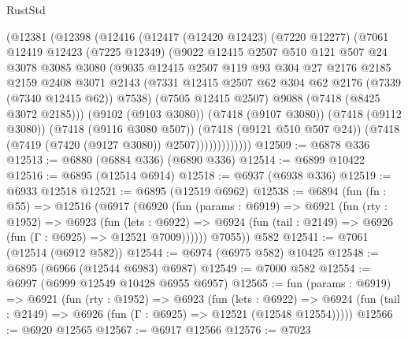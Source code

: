 \begin{lexlean}{RustStd}
\begin{coremodule}
              (@12381
                (@12398
                  (@12416
                    (@12417
                      (@12420 @12423)
                      (@7220 @12277)
                      (@7061
                        @12419
                        @12423
                        (@7225 @12349)
                        (@9022
                          @12415
                          @2507
                          @510
                          @121
                          @507
                          @24
                          @3078
                          @3085
                          @3080
                          (@9035
                            @12415
                            @2507
                            @119
                            @93
                            @304
                            @27
                            @2176
                            @2185
                            @2159
                            @2408
                            @3071
                            @2143
                            (@7331 @12415 @2507 @62 @304 @62 @2176 (@7339 (@7340 @12415 @62)) @7538)
                            (@7505 @12415 @2507)
                            @9088
                            (@7418 (@8425 @3072 @2185)))
                          (@9102 (@9103 @3080))
                          (@7418 (@9107 @3080))
                          (@7418 (@9112 @3080))
                          (@7418 (@9116 @3080 @507))
                          (@7418 (@9121 @510 @507 @24))
                          (@7418 (@7419 (@7420 (@9127 @3080)) @2507)))))))))))))
@12509 := @6878 @336
@12513 := @6880 (@6884 @336) (@6890 @336)
@12514 := @6899 @10422
@12516 := @6895 (@12514 @6914)
@12518 := @6937 (@6938 @336)
@12519 := @6933 @12518
@12521 := @6895 (@12519 @6962)
@12538 := @6894
    (fun (fn : @55) =>
    @12516
      (@6917
        (@6920
          (fun (params : @6919) =>
          @6921
            (fun (rty : @1952) =>
            @6923
              (fun (lets : @6922) =>
              @6924 (fun (tail : @2149) => @6926 (fun (Γ : @6925) => @12521 @7009))))))
        @7055))
    @582
@12541 := @7061 (@12514 (@6912 @582))
@12544 := @6974 (@6975 @582) @10425
@12548 := @6895 (@6966 (@12544 @6983) @6987)
@12549 := @7000 @582
@12554 := @6997 (@6999 @12549 @10428 @6955 @6957)
@12565 := fun (params : @6919) =>
  @6921
    (fun (rty : @1952) =>
    @6923
      (fun (lets : @6922) =>
      @6924 (fun (tail : @2149) => @6926 (fun (Γ : @6925) => @12521 (@12548 @12554)))))
@12566 := @6920 @12565
@12567 := @6917 @12566
@12576 := @7023

\end{coremodule}
\end{lexlean}
